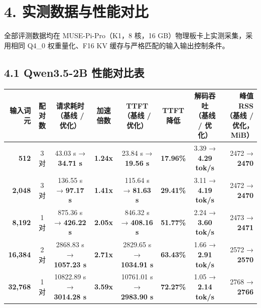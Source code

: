 \documentclass[10pt,a4paper,fontset=none]{ctexart}
\begin{document}
\section{4. 实测数据与性能对比}

全部评测数据均在 MUSE-Pi-Pro（K1，8 核，16 GB）物理板卡上实测采集，采用相同 Q4\_0 权重量化、F16 KV 缓存与严格匹配的输入输出控制条件。

\subsection{4.1 Qwen3.5-2B 性能对比表}

\begin{scriptsize}
\setlength{\tabcolsep}{2.5pt}
\begin{tabular*}{\textwidth}{@{\extracolsep{\fill}}rccccccr@{}}
\toprule
\textbf{输入词元} & \textbf{配对数} & \shortstack{\textbf{请求耗时}\\（基线 / 优化）} & \textbf{加速倍数} & \shortstack{\textbf{TTFT}\\（基线 / 优化）} & \shortstack{\textbf{TTFT}\\降低} & \shortstack{\textbf{解码吞吐}\\（基线 / 优化）} & \shortstack{\textbf{峰值 RSS}\\（基线 / 优化，MiB）} \\
\midrule
\textbf{512} & 3 对 & 43.03 s → \textbf{34.71 s} & \textbf{1.24x} & 23.84 s → \textbf{19.56 s} & \textbf{17.96\%} & 3.39 → \textbf{4.29 tok/s} & 2472 → \textbf{2470} \\
\textbf{2,048} & 3 对 & 136.55 s → \textbf{97.17 s} & \textbf{1.41x} & 115.64 s → \textbf{81.63 s} & \textbf{29.41\%} & 3.11 → \textbf{4.19 tok/s} & 2472 → \textbf{2470} \\
\textbf{8,192} & 1 对 & 875.36 s → \textbf{426.22 s} & \textbf{2.05x} & 846.32 s → \textbf{408.16 s} & \textbf{51.77\%} & 2.24 → \textbf{3.60 tok/s} & 2473 → \textbf{2471} \\
\textbf{16,384} & 2 对 & 2868.83 s → \textbf{1057.23 s} & \textbf{2.71x} & 2829.65 s → \textbf{1034.91 s} & \textbf{63.43\%} & 1.66 → \textbf{2.91 tok/s} & 2572 → \textbf{2570} \\
\textbf{32,768} & 1 对 & 10822.89 s → \textbf{3014.28 s} & \textbf{3.59x} & 10761.01 s → \textbf{2983.90 s} & \textbf{72.27\%} & 1.05 → \textbf{2.14 tok/s} & 2768 → \textbf{2766} \\
\bottomrule
\end{tabular*}
\end{scriptsize}
\end{document}
